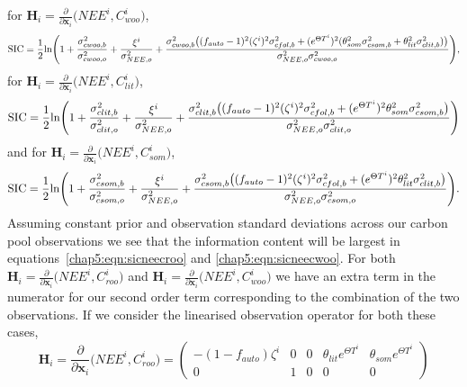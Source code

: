 for \(\textbf{H}_{i} = \frac{\partial}{\partial \textbf{x}_{i}}\big(NEE^{i}, C_{woo}^{i} \big) \),
\begin{equation}
\text{SIC} = \frac{1}{2}\text{ln} \Bigg( 1 + \frac{\sigma_{cwoo,b}^{2}}{\sigma_{cwoo,o}^{2}} + \frac{\xi^{i}}{\sigma_{NEE,o}^{2}} + \\
 \frac{\sigma_{cwoo,b}^{2}\big((f_{auto}-1)^{2}(\zeta^{i})^{2}\sigma_{cfol,b}^{2} + (e^{\Theta T^{i}})^2(\theta_{som}^2\sigma_{csom,b}^2+\theta_{lit}^2\sigma_{clit,b}^2)\big)}{\sigma_{NEE,o}^{2}\sigma_{cwoo,o}^{2}} \Bigg), \label{chap5:eqn:sicneecwoo}
 \end{equation}
 for \(\textbf{H}_{i} = \frac{\partial}{\partial \textbf{x}_{i}}\big(NEE^{i}, C_{lit}^{i} \big) \),
 \begin{equation}
\text{SIC} = \frac{1}{2}\text{ln} \Bigg( 1 + \frac{\sigma_{clit,b}^{2}}{\sigma_{clit,o}^{2}} + \frac{\xi^{i}}{\sigma_{NEE,o}^{2}} + \\
 \frac{\sigma_{clit,b}^{2}\big((f_{auto}-1)^{2}(\zeta^{i})^{2}\sigma_{cfol,b}^{2} + (e^{\Theta T^{i}})^2\theta_{som}^2\sigma_{csom,b}^2\big)}{\sigma_{NEE,o}^{2}\sigma_{clit,o}^{2}} \Bigg) \label{chap5:eqn:sicneeclit}
 \end{equation}
 and for \(\textbf{H}_{i} = \frac{\partial}{\partial \textbf{x}_{i}}\big(NEE^{i}, C_{som}^{i} \big) \),
 \begin{equation}
\text{SIC} = \frac{1}{2}\text{ln} \Bigg( 1 + \frac{\sigma_{csom,b}^{2}}{\sigma_{csom,o}^{2}} + \frac{\xi^{i}}{\sigma_{NEE,o}^{2}} + \\
 \frac{\sigma_{csom,b}^{2}\big((f_{auto}-1)^{2}(\zeta^{i})^{2}\sigma_{cfol,b}^{2} + (e^{\Theta T^{i}})^2\theta_{lit}^2\sigma_{clit,b}^2\big)}{\sigma_{NEE,o}^{2}\sigma_{csom,o}^{2}} \Bigg). \label{chap5:eqn:sicneecsom}
 \end{equation}
Assuming constant prior and observation standard deviations across our carbon pool observations we see that the information content will be largest in equations~\eqref{chap5:eqn:sicneecroo} and \eqref{chap5:eqn:sicneecwoo}. For both \(\textbf{H}_{i} = \frac{\partial}{\partial \textbf{x}_{i}}\big(NEE^{i}, C_{roo}^{i} \big) \) and \(\textbf{H}_{i} = \frac{\partial}{\partial \textbf{x}_{i}}\big(NEE^{i}, C_{woo}^{i} \big) \) we have an extra term in the numerator for our second order term corresponding to the combination of the two observations. If we consider the linearised observation operator for both these cases,
\begin{equation}
\textbf{H}_{i} = \frac{\partial}{\partial \textbf{x}_{i}}\big(NEE^{i}, C_{roo}^{i} \big) =
 \begin{pmatrix}
-(1-f_{auto})\zeta^i & 0 & 0 & \theta_{lit} e^{\Theta T^{i}} & \theta_{som} e^{\Theta T^{i}}\\
0 & 1 & 0 & 0 & 0
\end{pmatrix}
\end{equation}
